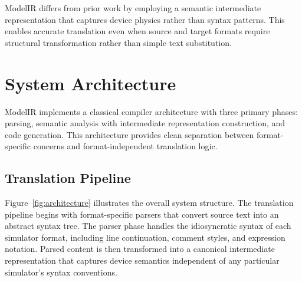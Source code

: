 \documentclass[conference]{IEEEtran}
\begin{document}
ModelIR differs from prior work by employing a semantic intermediate representation that captures device physics rather than syntax patterns. This enables accurate translation even when source and target formats require structural transformation rather than simple text substitution.

\section{System Architecture}
\label{sec:architecture}

ModelIR implements a classical compiler architecture with three primary phases: parsing, semantic analysis with intermediate representation construction, and code generation. This architecture provides clean separation between format-specific concerns and format-independent translation logic.

\subsection{Translation Pipeline}

Figure~\ref{fig:architecture} illustrates the overall system structure. The translation pipeline begins with format-specific parsers that convert source text into an abstract syntax tree. The parser phase handles the idiosyncratic syntax of each simulator format, including line continuation, comment styles, and expression notation. Parsed content is then transformed into a canonical intermediate representation that captures device semantics independent of any particular simulator's syntax conventions.
\end{document}
